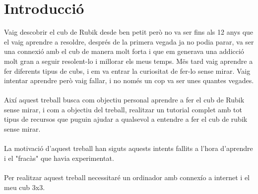 \section*{Introducció}

Vaig descobrir el cub de Rubik desde ben petit però no va ser fins als 12 anys que el vaig aprendre a resoldre, després de la primera vegada ja no podia parar, va ser una connexió amb el cub de manera molt forta i que em generava una addicció molt gran a seguir resolent-lo i millorar els meus temps.
Mës tard vaig aprendre a fer diferents tipus de cubs, i em va entrar la curiositat de fer-lo sense mirar. Vaig intentar aprendre però vaig fallar, i no només un cop va ser unes quantes vegades.
\\\\Així aquest treball busca com objectiu personal aprendre a fer el cub de Rubik sense mirar, i com a objectiu del treball, realitzar un tutorial complet amb tot tipus de recursos que puguin ajudar a qualsevol a entendre a fer el cub de rubik sense mirar.
\\\\La motivació d'aquest treball han siguts aquests intents fallits a l'hora d'aprendre i el "fracàs" que havia experimentat.
\\\\Per realitzar aquest treball necessitaré un ordinador amb connexío a internet i el meu cub 3x3.




